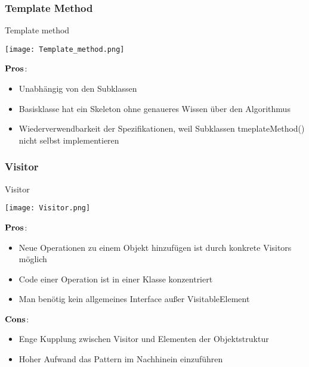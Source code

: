 \subsubsection{Template Method}
\begin{table}[H]
\caption{Template method}
\texttt{[image: Template\_method.png]}
\end{table}
\begin{multicols}{2}
$\bold{Pros}$:
\begin{itemize}
	\item Unabhängig von den Subklassen
	\item Basisklasse hat ein Skeleton ohne genaueres Wissen über den Algorithmus
	\item Wiederverwendbarkeit der Spezifikationen, weil Subklassen tmeplateMethod() nicht selbst implementieren
\end{itemize}	
\end{multicols}
\subsubsection{Visitor}
\begin{table}[H]
\caption{Visitor}
\texttt{[image: Visitor.png]}
\end{table}
\begin{multicols}{2}
$\bold{Pros}$:
\begin{itemize}
	\item Neue Operationen zu einem Objekt hinzufügen ist durch konkrete Visitors möglich
	\item Code einer Operation ist in einer Klasse konzentriert
	\item Man benötig kein allgemeines Interface außer VisitableElement
\end{itemize}
\columnbreak
$\bold{Cons}$:
\begin{itemize}
	\item Enge Kupplung zwischen Visitor und Elementen der Objektstruktur
	\item Hoher Aufwand das Pattern im Nachhinein einzuführen 
\end{itemize}
\end{multicols}




 













